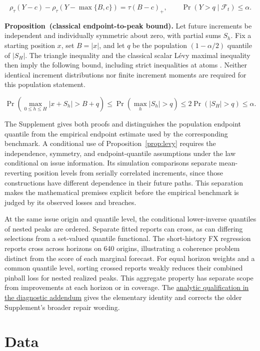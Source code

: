 \documentclass[11pt,a4paper]{article}
\newcounter{proposition}
\begin{document}
\[
\rho_\tau(Y-c)-\rho_\tau(Y-\max\{B,c\})=\tau(B-c)_+,\qquad \Pr(Y>q\mid\mathcal F_t)\le\alpha.
\]

\noindent\textbf{Proposition~\theproposition (classical endpoint-to-peak bound).}\label{prop:levy} Let future increments be independent and individually symmetric about zero, with partial sums \(S_h\). Fix a starting position \(x\), set \(B=|x|\), and let \(q\) be the population \((1-\alpha/2)\) quantile of \(|S_H|\). The triangle inequality and the classical scalar L\'evy maximal inequality then imply the following bound, including strict inequalities at atoms \citep{sussman2023}. Neither identical increment distributions nor finite increment moments are required for this population statement.


\[
\Pr\!\left(\max_{0\le h\le H}|x+S_h|>B+q\right)\le\Pr\!\left(\max_h|S_h|>q\right)\le2\Pr(|S_H|>q)\le\alpha.
\]

The Supplement gives both proofs and distinguishes the population endpoint quantile from the empirical endpoint estimate used by the corresponding benchmark. A conditional use of Proposition~\ref{prop:levy} requires the independence, symmetry, and endpoint-quantile assumptions under the law conditional on issue information. Its simulation comparisons separate mean-reverting position levels from serially correlated increments, since those constructions have different dependence in their future paths. This separation makes the mathematical premises explicit before the empirical benchmark is judged by its observed losses and breaches.


At the same issue origin and quantile level, the conditional lower-inverse quantiles of nested peaks are ordered. Separate fitted reports can cross, as can differing selections from a set-valued quantile functional. The short-history FX regression reports cross across horizons on 640 origins, illustrating a coherence problem distinct from the score of each marginal forecast. For equal horizon weights and a common quantile level, sorting crossed reports weakly reduces their combined pinball loss for nested realized peaks. This aggregate property has separate scope from improvements at each horizon or in coverage. The \href{diagnostic-addendum.pdf}{analytic qualification in the diagnostic addendum} gives the elementary identity and corrects the older Supplement's broader repair wording.


\FloatBarrier

\section{Data}\label{sec:data}
\end{document}

